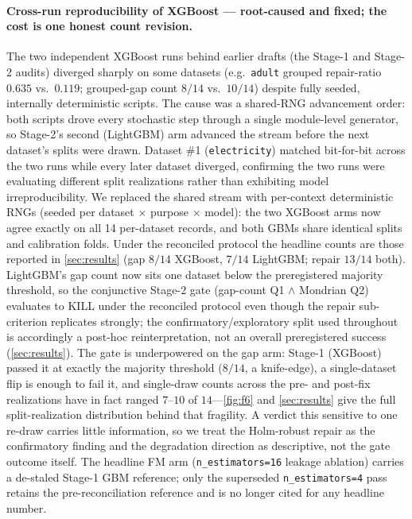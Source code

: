 \documentclass[11pt]{article}
\begin{document}
\paragraph{Cross-run reproducibility of XGBoost --- root-caused and fixed; the cost is one honest count
revision.} The two independent XGBoost runs behind earlier drafts (the Stage-1 and Stage-2 audits) diverged
sharply on some datasets (e.g.\ \texttt{adult} grouped repair-ratio $0.635$ vs.\ $0.119$; grouped-gap count
$8/14$ vs.\ $10/14$) despite fully seeded, internally deterministic scripts. The cause was a shared-RNG
advancement order: both scripts drove every stochastic step through a single module-level generator, so
Stage-2's second (LightGBM) arm advanced the stream before the next dataset's splits were drawn. Dataset
\#1 (\texttt{electricity}) matched bit-for-bit across the two runs while every later dataset diverged,
confirming the two runs were evaluating different split realizations rather than exhibiting model
irreproducibility. We replaced the shared stream with per-context deterministic RNGs (seeded per dataset
$\times$ purpose $\times$ model): the two XGBoost arms now agree exactly on all 14 per-dataset records, and
both GBMs share identical splits and calibration folds. Under the reconciled protocol the headline counts
are those reported in \cref{sec:results} (gap $8/14$ XGBoost, $7/14$ LightGBM; repair $13/14$ both). LightGBM's
gap count now sits one dataset below the preregistered majority threshold, so the conjunctive Stage-2 gate
(gap-count Q1 $\wedge$ Mondrian Q2) evaluates to KILL under the reconciled protocol even though the repair
sub-criterion replicates strongly; the confirmatory/exploratory split used throughout is accordingly a
post-hoc reinterpretation, not an overall preregistered success (\cref{sec:results}). The gate is
underpowered on the gap arm: Stage-1 (XGBoost) passed it at exactly the majority threshold ($8/14$, a
knife-edge), a single-dataset flip is enough to fail it, and single-draw counts across the pre- and post-fix
realizations have in fact ranged $7$--$10$ of $14$---\cref{fig:f6} and \cref{sec:results} give the full
split-realization distribution behind that fragility. A verdict this sensitive to one re-draw carries
little information, so we treat the Holm-robust repair as the confirmatory finding and the degradation
direction as descriptive, not the gate outcome itself. The headline FM arm
(\texttt{n\_estimators=16} leakage ablation) carries a de-staled Stage-1 GBM reference; only the superseded
\texttt{n\_estimators=4} pass retains the pre-reconciliation reference and is no longer cited for any headline number.
\end{document}
